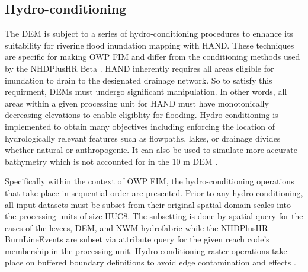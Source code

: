 \subsection{Hydro-conditioning}
\label{ssec:hydro_conditioning}
%
The DEM is subject to a series of hydro-conditioning procedures to enhance its suitability for riverine flood inundation mapping with HAND. 
These techniques are specific for making OWP FIM and differ from the conditioning methods used by the NHDPlusHR Beta \cite{moore2019user}.
HAND inherently requires all areas eligible for inundation to drain to the designated drainage network.
So to satisfy this requirment, DEMs must undergo significant manipulation.
In other words, all areas within a given processing unit for HAND must have monotonically decreasing elevations to enable eligiblity for flooding.
Hydro-conditioning is implemented to obtain many objectives including enforcing the location of hydrologically relevant features such as flowpaths, lakes, or drainage divides whether natural or anthropogenic. 
It can also be used to simulate more accurate bathymetry which is not accounted for in the 10 m DEM \cite{gesch2002national}.

Specifically within the context of OWP FIM, the hydro-conditioning operations that take place in sequential order are presented. 
Prior to any hydro-conditioning, all input datasets must be subset from their original spatial domain scales into the processing units of size HUC8. 
The subsetting is done by spatial query for the cases of the levees, DEM, and NWM hydrofabric while the NHDPlusHR BurnLineEvents are subset via attribute query for the given reach code's membership in the processing unit.
Hydro-conditioning raster operations take place on buffered boundary definitions to avoid edge contamination and effects \cite{lindsay2013measuring}. 
%
